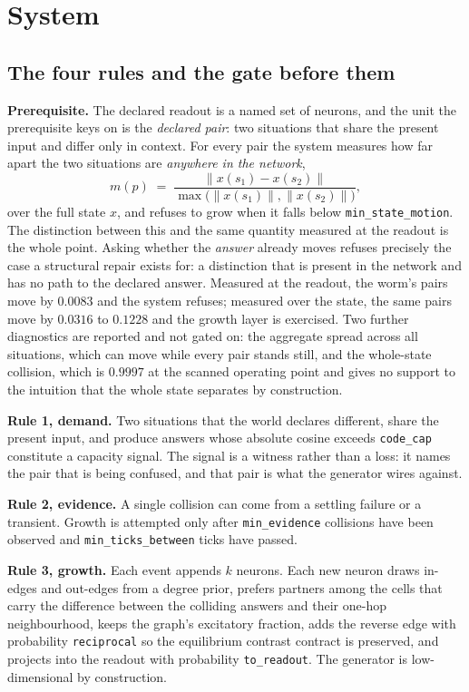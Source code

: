 \documentclass[11pt]{article}
\theoremstyle{remark}
\newcommand{\norm}[1]{\lVert #1 \rVert}
\begin{document}
\section{System}

\subsection{The four rules and the gate before them}

\textbf{Prerequisite.} The declared readout is a named set of neurons, and the unit the
prerequisite keys on is the \emph{declared pair}: two situations that share the present input and
differ only in context. For every pair the system measures how far apart the two situations are \emph{anywhere in the
network},
\[
m(p) \;=\; \frac{\norm{x(s_1)-x(s_2)}}{\max\big(\norm{x(s_1)}, \norm{x(s_2)}\big)},
\]
over the full state $x$, and refuses to grow when it falls below \texttt{min\_state\_motion}. The
distinction between this and the same quantity measured at the readout is the whole point. Asking
whether the \emph{answer} already moves refuses precisely the case a structural repair exists for: a
distinction that is present in the network and has no path to the declared answer. Measured at the
readout, the worm's pairs move by $0.0083$ and the system refuses; measured over the state, the
same pairs move by $0.0316$ to $0.1228$ and the growth layer is exercised. Two further diagnostics
are reported and not gated on: the aggregate spread across all situations, which can move while
every pair stands still, and the whole-state collision, which is $0.9997$ at the scanned operating
point and gives no support to the intuition that the whole state separates by construction.

\textbf{Rule 1, demand.} Two situations that the world declares different, share the present input,
and produce answers whose absolute cosine exceeds \texttt{code\_cap} constitute a capacity signal.
The signal is a witness rather than a loss: it names the pair that is being confused, and that pair
is what the generator wires against.

\textbf{Rule 2, evidence.} A single collision can come from a settling failure or a transient.
Growth is attempted only after \texttt{min\_evidence} collisions have been observed and
\texttt{min\_ticks\_between} ticks have passed.

\textbf{Rule 3, growth.} Each event appends $k$ neurons. Each new neuron draws in-edges and
out-edges from a degree prior, prefers partners among the cells that carry the difference between
the colliding answers and their one-hop neighbourhood, keeps the graph's excitatory fraction, adds
the reverse edge with probability \texttt{reciprocal} so the equilibrium contrast contract is
preserved, and projects into the readout with probability \texttt{to\_readout}. The generator is
low-dimensional by construction.
\end{document}

